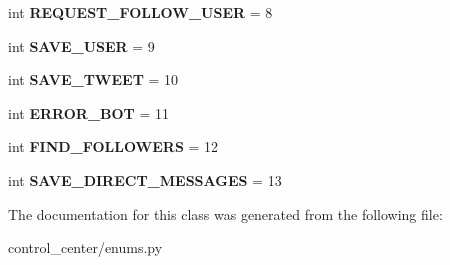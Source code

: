 \begin{DoxyCompactItemize}
\mbox{\label{classtwitter_1_1control__center_1_1enums_1_1MessageTypes_ac1debc137c3bdd350d47842824b1d510}} 
int {\bfseries R\+E\+Q\+U\+E\+S\+T\+\_\+\+F\+O\+L\+L\+O\+W\+\_\+\+U\+S\+ER} = 8
\item 
\mbox{\label{classtwitter_1_1control__center_1_1enums_1_1MessageTypes_a2a089d289ff787e4b83a1e3fc88f1cf6}} 
int {\bfseries S\+A\+V\+E\+\_\+\+U\+S\+ER} = 9
\item 
\mbox{\label{classtwitter_1_1control__center_1_1enums_1_1MessageTypes_a51744590d4ab277af15967f673bd9f81}} 
int {\bfseries S\+A\+V\+E\+\_\+\+T\+W\+E\+ET} = 10
\item 
\mbox{\label{classtwitter_1_1control__center_1_1enums_1_1MessageTypes_a5d28dcbde8f1cf73eeae72d5e4255fa9}} 
int {\bfseries E\+R\+R\+O\+R\+\_\+\+B\+OT} = 11
\item 
\mbox{\label{classtwitter_1_1control__center_1_1enums_1_1MessageTypes_a2a3ad2cdcd0a0a790e16e9c22103783c}} 
int {\bfseries F\+I\+N\+D\+\_\+\+F\+O\+L\+L\+O\+W\+E\+RS} = 12
\item 
\mbox{\label{classtwitter_1_1control__center_1_1enums_1_1MessageTypes_a410903a67e59e67bfdf781e6ce0ce6e9}} 
int {\bfseries S\+A\+V\+E\+\_\+\+D\+I\+R\+E\+C\+T\+\_\+\+M\+E\+S\+S\+A\+G\+ES} = 13
\end{DoxyCompactItemize}


The documentation for this class was generated from the following file\+:\begin{DoxyCompactItemize}
\item 
control\+\_\+center/enums.\+py\end{DoxyCompactItemize}

